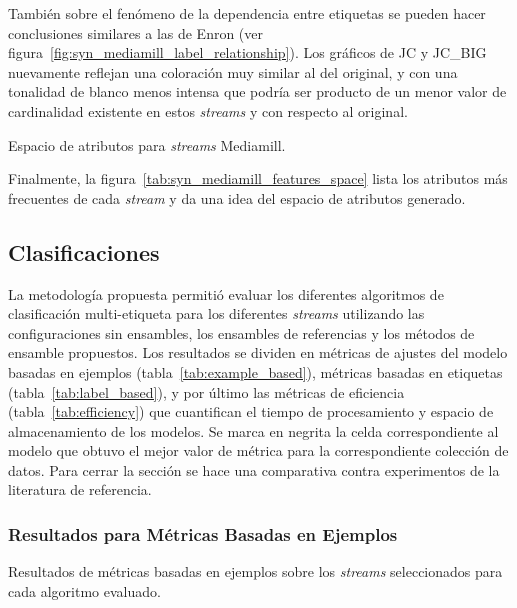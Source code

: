 También sobre el fenómeno de la dependencia entre etiquetas se pueden hacer
conclusiones similares a las de Enron (ver
figura~\ref{fig:syn_mediamill_label_relationship}). Los gráficos de JC y JC\_BIG
nuevamente reflejan una coloración muy similar al del original, y con una
tonalidad de blanco menos intensa que podría ser producto de un menor valor de
cardinalidad existente en estos \textit{streams} y con respecto al original.

\begin{table}[htbp]
	\centering
	\begin{adjustbox}{max width=\textwidth}
		
	\end{adjustbox}
	\caption{Espacio de atributos para \textit{streams} Mediamill.}
	\label{tab:syn_mediamill_features_space}
\end{table}

Finalmente, la figura~\ref{tab:syn_mediamill_features_space} lista los atributos más
frecuentes de cada \textit{stream} y da una idea del espacio de atributos
generado.

\subsection{Clasificaciones}
\label{experimentos_clasificaciones}

La metodología propuesta permitió evaluar los diferentes algoritmos de
clasificación multi-etiqueta para los diferentes \textit{streams} utilizando las
configuraciones sin ensambles, los ensambles de referencias y los métodos de
ensamble propuestos. Los resultados se dividen en métricas de ajustes del modelo
basadas en ejemplos (tabla~\ref{tab:example_based}), métricas basadas en
etiquetas (tabla~\ref{tab:label_based}), y por último las métricas de eficiencia
(tabla~\ref{tab:efficiency}) que cuantifican el tiempo de procesamiento y
espacio de almacenamiento de los modelos. Se marca en negrita la celda
correspondiente al modelo que obtuvo el mejor valor de métrica para la
correspondiente colección de datos. Para cerrar la sección se hace una
comparativa contra experimentos de la literatura de referencia.

\subsubsection{Resultados para Métricas Basadas en Ejemplos}

\begin{table}[htbp]
	\centering
	\begin{adjustbox}{max width=\textwidth}
		
	\end{adjustbox}
	\begin{adjustbox}{max width=\textwidth}
		
	\end{adjustbox}
	\caption{Resultados de métricas basadas en ejemplos sobre los
		\textit{streams} seleccionados para cada algoritmo evaluado.}
	\label{tab:example_based}
\end{table}

